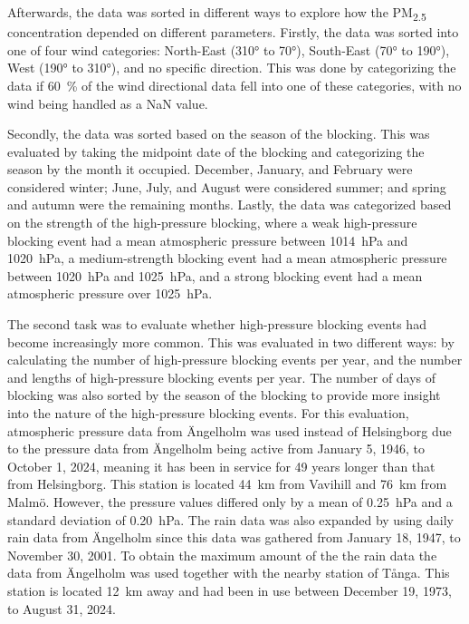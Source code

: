 Afterwards, the data was sorted in different ways to explore how the PM\textsubscript{2.5} concentration depended on different parameters. Firstly, the data was sorted into one of four wind categories: North-East (310° to 70°), South-East (70° to 190°), West (190° to 310°), and no specific direction. This was done by categorizing the data if \SI{60}{\%} of the wind directional data fell into one of these categories, with no wind being handled as a NaN value.

Secondly, the data was sorted based on the season of the blocking. This was evaluated by taking the midpoint date of the blocking and categorizing the season by the month it occupied. December, January, and February were considered winter; June, July, and August were considered summer; and spring and autumn were the remaining months. Lastly, the data was categorized based on the strength of the high-pressure blocking, where a weak high-pressure blocking event had a mean atmospheric pressure between \SI{1014}{\hecto\pascal} and \SI{1020}{\hecto\pascal}, a medium-strength blocking event had a mean atmospheric pressure between \SI{1020}{\hecto\pascal} and \SI{1025}{\hecto\pascal}, and a strong blocking event had a mean atmospheric pressure over \SI{1025}{\hecto\pascal}.

The second task was to evaluate whether high-pressure blocking events had become increasingly more common. This was evaluated in two different ways: by calculating the number of high-pressure blocking events per year, and the number and lengths of high-pressure blocking events per year. The number of days of blocking was also sorted by the season of the blocking to provide more insight into the nature of the high-pressure blocking events. For this evaluation, atmospheric pressure data from Ängelholm was used instead of Helsingborg due to the pressure data from Ängelholm being active from January 5, 1946, to October 1, 2024, meaning it has been in service for 49 years longer than that from Helsingborg. This station is located \SI{44}{\km} from Vavihill and \SI{76}{\km} from Malmö. However, the pressure values differed only by a mean of \SI{0.25}{\hecto\pascal} and a standard deviation of \SI{0.20}{\hecto\pascal}. The rain data was also expanded by using daily rain data from Ängelholm since this data was gathered from January 18, 1947, to November 30, 2001. To obtain the maximum amount of the the rain data the data from Ängelholm was used together with the nearby station of Tånga. This station is located \SI{12}{\km} away and had been in use between December 19, 1973, to August 31, 2024. 

